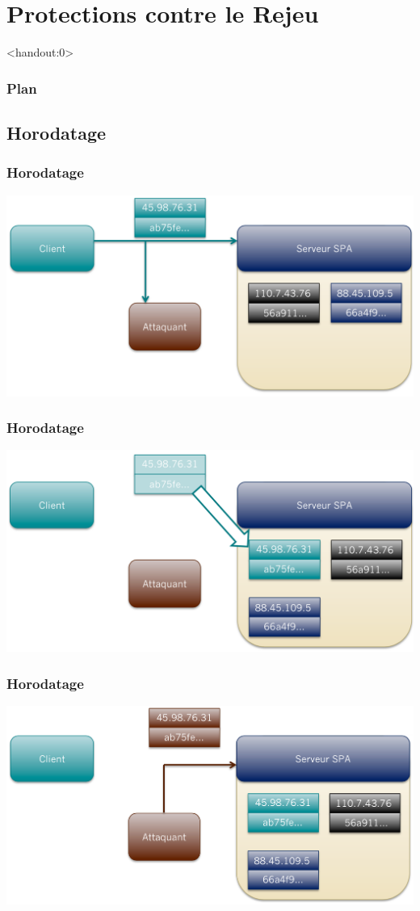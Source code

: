 \section{Protections contre le Rejeu}

\begin{frame}<handout:0>
  \frametitle{Plan}
  \tableofcontents[currentsection]
\end{frame}

\subsection{Horodatage}

\begin{frame}[fragile]
\frametitle{Horodatage}
\centerline{\includegraphics[scale=0.35]{horodatage_SPA1}}
\end{frame}

\begin{frame}[fragile]
\frametitle{Horodatage}
\centerline{\includegraphics[scale=0.35]{horodatage_SPA2}}
\end{frame}

\begin{frame}[fragile]
\frametitle{Horodatage}
\centerline{\includegraphics[scale=0.35]{horodatage_SPA3}}
\end{frame}

